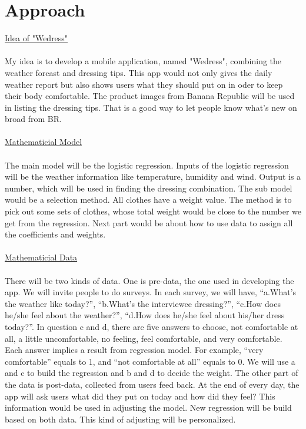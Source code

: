 \documentclass[12pt,letterpaper]{article}
\theoremstyle{definition}
\begin{document}
\section{Approach}
\underline {Idea of "Wedress"} \\
\\
My idea is to develop a mobile application, named "Wedress", combining the weather forcast and dressing tips. This app would not only gives the daily weather report but also shows users what they should put on in oder to keep their body comfortable. The product images from Banana Republic will be used in listing the dressing tips. That is a good way to let people know what's new on broad from BR.
\\\\
 \noindent\underline {Mathematicial Model} \\
\\
The main model will be the logistic regression. Inputs of the logistic regression will be the weather information like temperature, humidity and wind. Output is a number, which will be used in finding the dressing combination. The sub model would be a selection method. All clothes have a weight value. The method is to pick out some sets of clothes, whose total weight would be close to the number we get from the regression. Next part would be about how to use data to assign all the coefficients and weights.
\\\\
 \noindent\underline {Mathematicial Data} \\
\\
There will be two kinds of data. One is pre-data, the one used in developing the app. We will invite people to do surveys. In each survey, we will have, “a.What’s the weather like today?”, “b.What’s the interviewee dressing?”, “c.How does he/she feel about the weather?”, “d.How does he/she feel about his/her dress today?”. In question c and d, there are five answers to choose, not comfortable at all, a little uncomfortable, no feeling, feel comfortable, and very comfortable. Each answer implies a result from regression model. For example, “very comfortable” equals to 1, and “not comfortable at all” equals to 0. We will use a and c to build the regression and b and d to decide the weight. The other part of the data is post-data, collected from users feed back. At the end of every day, the app will ask users what did they put on today and how did they feel? This information would be used in adjusting the model. New regression will be build based on both data. This kind of adjusting will be personalized.
\end{document}
